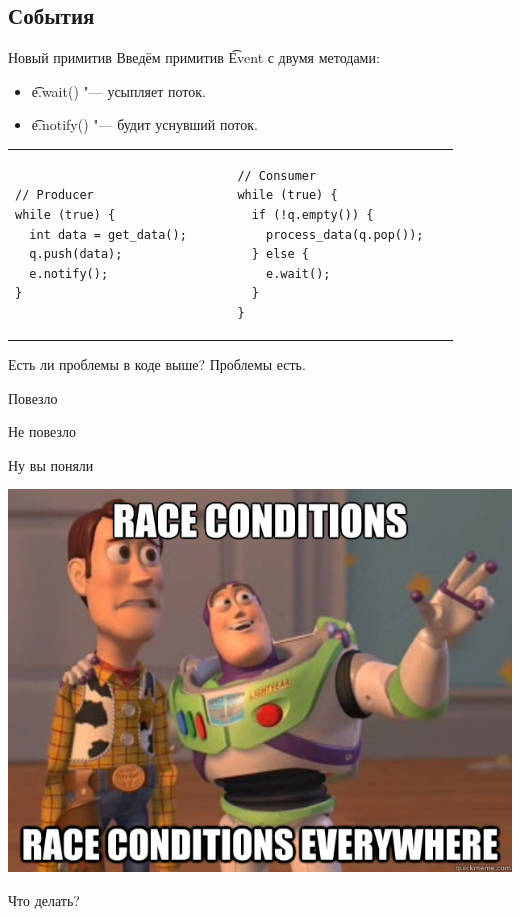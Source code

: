 \subsection{События}

\begin{frame}[fragile]{Новый примитив}
	Введём примитив \t{Event} с двумя методами:
	\begin{itemize}
		\item \t{e.wait()} "--- усыпляет поток.
		\item \t{e.notify()} "--- будит уснувший поток.
	\end{itemize}
	\begin{tabular}{p{0.45\linewidth}p{0.45\linewidth}}
		\centering
\begin{verbatim}
// Producer
while (true) {
  int data = get_data();
  q.push(data);
  e.notify();
}
\end{verbatim}
&
\begin{verbatim}
// Consumer
while (true) {
  if (!q.empty()) {
    process_data(q.pop());
  } else {
    e.wait();
  }
}
\end{verbatim}
	\end{tabular}
	Есть ли проблемы в коде выше?
	\pause
	Проблемы есть.
\end{frame}

\begin{frame}{Повезло}
\end{frame}

\begin{frame}{Не повезло}
\end{frame}

\begin{frame}{Ну вы поняли}
	\begin{center}
		\includegraphics[scale=0.4]{race-condition-everywhere.jpg}
	\end{center}
	Что делать?
\end{frame}


